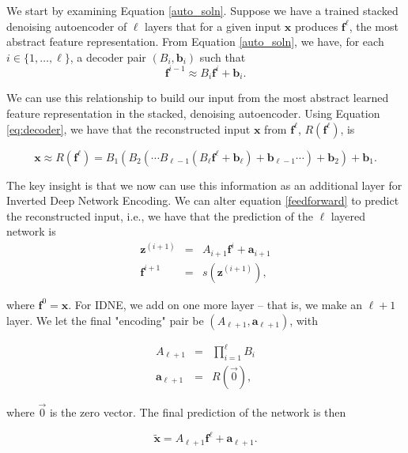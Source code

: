 We start by examining Equation \eqref{auto_soln}. Suppose we have a trained stacked denoising autoencoder  of $\ell$ layers that for a given input $\mathbf{x}$ produces $\mathbf{f}^\ell$, the most abstract feature representation. From Equation \eqref{auto_soln}, we have, for each $i\in\{1,\ldots,\ell\}$, a decoder pair $(B_i, \mathbf{b}_i)$ such that 
\begin{equation}
\label{eq:decoder}
\mathbf{f}^{i-1} \approx B_i \mathbf{f}^{i} + \mathbf{b}_i.
\end{equation}

We can use this relationship to build our input from the most abstract learned feature representation in the stacked, denoising autoencoder. Using Equation \eqref{eq:decoder}, we have that the reconstructed input $\mathbf{x}$ from $\mathbf{f}^\ell$, $R(\mathbf{f}^\ell)$, is

\begin{equation}
\mathbf{x}\approx R( \mathbf{f}^{\ell})  = B_1 (B_2 (\cdots B_{\ell-1}(B_\ell \mathbf{f}^{\ell} + \mathbf{b}_\ell) + \mathbf{b}_{\ell - 1} \cdots ) + \mathbf{b}_2) + \mathbf{b}_1.
\end{equation} 

The key insight is that we now can use this information as an additional layer for Inverted Deep Network Encoding. We can alter equation \eqref{feedforward} to predict the reconstructed input, i.e., we have that the prediction of the $\ell$ layered network is 
\begin{eqnarray}
\label{fd1}
\mathbf{z}^{(i+1)} &=& A_{i+1} \mathbf{f}^{i} + \mathbf{a}_{i+1}\\
\mathbf{f}^{i+1} &=& s(\mathbf{z}^{(i+1)}),
\end{eqnarray}

where $\mathbf{f}^0 = \mathbf{x}$. For IDNE, we add on one more layer -- that is, we make an $\ell + 1$ layer. We let the final "encoding" pair be $(A_{\ell+1}, \mathbf{a}_{\ell+1})$, with

\begin{eqnarray}
A_{\ell+1} &=& \prod_{i=1}^{\ell} B_i \\ 
\mathbf{a}_{\ell+1} &=& R(\overrightarrow{0}),
\end{eqnarray}

where $\overrightarrow{0}$ is the zero vector. The final prediction of the network is then

\begin{equation}
\label{fd2}
\tilde{\mathbf{x}} = A_{\ell +1}\mathbf{f}^\ell + \mathbf{a}_{\ell+1}.
\end{equation}

